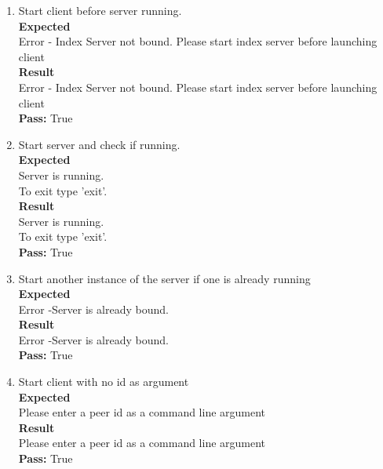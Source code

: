 \documentclass{article}
\begin{document}
\begin{enumerate}

\item Start client before server running.\\
\textbf{Expected}\\
Error - Index Server not bound. Please start index server before launching client\\
\textbf{Result}\\
Error - Index Server not bound. Please start index server before launching client\\
\textbf{Pass:} True\\

\item Start server and check if running.\\
\textbf{Expected}\\
Server is running.\\
To exit type 'exit'.\\
\textbf{Result}\\
Server is running.\\
To exit type 'exit'.\\
\textbf{Pass:} True\\

\item Start another instance of the server if one is already running\\
\textbf{Expected}\\
Error -Server is already bound.\\
\textbf{Result}\\
Error -Server is already bound.\\
\textbf{Pass:} True\\


\item Start client with no id as argument\\
\textbf{Expected}\\
Please enter a peer id as a command line argument\\
\textbf{Result}\\
Please enter a peer id as a command line argument\\
\textbf{Pass:} True\\



\end{enumerate}
\end{document}

